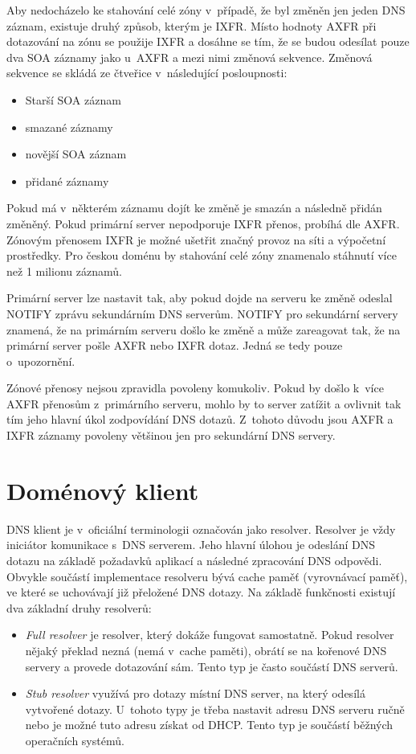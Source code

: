 \documentclass[thesis=M,czech]{src/FITthesis}[2019/12/23]
\begin{document}
Aby nedocházelo ke stahování celé zóny v~případě, že byl změněn jen jeden DNS záznam, existuje druhý způsob, kterým je IXFR. Místo hodnoty AXFR při dotazování na zónu se použije IXFR a dosáhne se tím, že se budou odesílat pouze dva SOA záznamy jako u~AXFR a mezi nimi změnová sekvence. Změnová sekvence se skládá ze čtveřice v~následující posloupnosti: 

\begin{itemize}
	\item Starší SOA záznam
	\item smazané záznamy
	\item novější SOA záznam
	\item přidané záznamy
\end{itemize}

Pokud má v~některém záznamu dojít ke změně je smazán a následně přidán změněný. Pokud primární server nepodporuje IXFR přenos, probíhá dle AXFR. Zónovým přenosem IXFR je možné ušetřit značný provoz na síti a výpočetní prostředky. Pro českou doménu by stahování celé zóny znamenalo stáhnutí více než 1 milionu záznamů.

Primární server lze nastavit tak, aby pokud dojde na serveru ke změně odeslal NOTIFY zprávu sekundárním DNS serverům. NOTIFY pro sekundární servery znamená, že na primárním serveru došlo ke změně a může zareagovat tak, že na primární server pošle AXFR nebo IXFR dotaz. Jedná se tedy pouze o~upozornění. 

Zónové přenosy nejsou zpravidla povoleny komukoliv. Pokud by došlo k~více AXFR přenosům z~primárního serveru, mohlo by to server zatížit a ovlivnit tak tím jeho hlavní úkol zodpovídání DNS dotazů. Z~tohoto důvodu jsou AXFR a IXFR záznamy povoleny většinou jen pro sekundární DNS servery. \cite{RFC1035, RFC1995}




\section{Doménový klient}
DNS klient je v~oficiální terminologii označován jako resolver. Resolver je vždy iniciátor komunikace s~DNS serverem. Jeho hlavní úlohou je odeslání DNS dotazu na základě požadavků aplikací a následné zpracování DNS odpovědi. Obvykle součástí implementace resolveru bývá cache paměť (vyrovnávací paměť), ve které se uchovávají již přeložené DNS dotazy. Na základě funkčnosti existují dva základní druhy resolverů:

\begin{itemize}
	\item \textit{Full resolver} je resolver, který dokáže fungovat samostatně. Pokud resolver nějaký překlad nezná (nemá v~cache paměti), obrátí se na kořenové DNS servery a provede dotazování sám. Tento typ je často součástí DNS serverů. 
	\item \textit{Stub resolver} využívá pro dotazy místní DNS server, na který odesílá vytvořené dotazy. U~tohoto typy je třeba nastavit adresu DNS serveru ručně nebo je možné tuto adresu získat od DHCP. Tento typ je součástí běžných operačních systémů. 
\end{itemize}  
\end{document}
